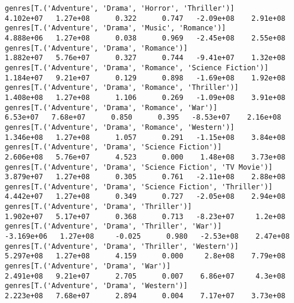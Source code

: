 \documentclass[11pt]{article}
\begin{document}
\begin{Verbatim}[commandchars=\\\{\}]
genres[T.('Adventure', 'Drama', 'Horror', 'Thriller')]                                                        4.102e+07   1.27e+08      0.322      0.747   -2.09e+08    2.91e+08
genres[T.('Adventure', 'Drama', 'Music', 'Romance')]                                                          4.888e+06   1.27e+08      0.038      0.969   -2.45e+08    2.55e+08
genres[T.('Adventure', 'Drama', 'Romance')]                                                                   1.882e+07   5.76e+07      0.327      0.744   -9.41e+07    1.32e+08
genres[T.('Adventure', 'Drama', 'Romance', 'Science Fiction')]                                                1.184e+07   9.21e+07      0.129      0.898   -1.69e+08    1.92e+08
genres[T.('Adventure', 'Drama', 'Romance', 'Thriller')]                                                       1.408e+08   1.27e+08      1.106      0.269   -1.09e+08    3.91e+08
genres[T.('Adventure', 'Drama', 'Romance', 'War')]                                                             6.53e+07   7.68e+07      0.850      0.395   -8.53e+07    2.16e+08
genres[T.('Adventure', 'Drama', 'Romance', 'Western')]                                                        1.346e+08   1.27e+08      1.057      0.291   -1.15e+08    3.84e+08
genres[T.('Adventure', 'Drama', 'Science Fiction')]                                                           2.606e+08   5.76e+07      4.523      0.000    1.48e+08    3.73e+08
genres[T.('Adventure', 'Drama', 'Science Fiction', 'TV Movie')]                                               3.879e+07   1.27e+08      0.305      0.761   -2.11e+08    2.88e+08
genres[T.('Adventure', 'Drama', 'Science Fiction', 'Thriller')]                                               4.442e+07   1.27e+08      0.349      0.727   -2.05e+08    2.94e+08
genres[T.('Adventure', 'Drama', 'Thriller')]                                                                  1.902e+07   5.17e+07      0.368      0.713   -8.23e+07     1.2e+08
genres[T.('Adventure', 'Drama', 'Thriller', 'War')]                                                          -3.169e+06   1.27e+08     -0.025      0.980   -2.53e+08    2.47e+08
genres[T.('Adventure', 'Drama', 'Thriller', 'Western')]                                                       5.297e+08   1.27e+08      4.159      0.000     2.8e+08    7.79e+08
genres[T.('Adventure', 'Drama', 'War')]                                                                       2.491e+08   9.21e+07      2.705      0.007    6.86e+07     4.3e+08
genres[T.('Adventure', 'Drama', 'Western')]                                                                   2.223e+08   7.68e+07      2.894      0.004    7.17e+07    3.73e+08

\end{Verbatim}
\end{document}
